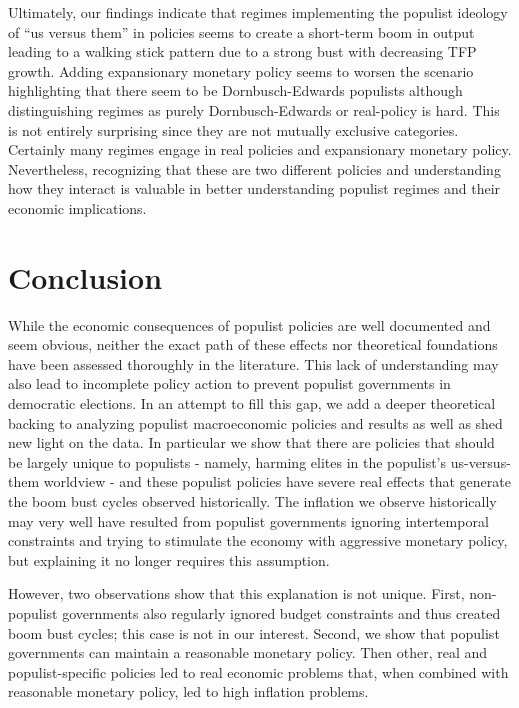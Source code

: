 \documentclass{OUP-EJ}
\begin{document}
Ultimately, our findings indicate that regimes implementing the populist ideology of “us versus them” in policies seems to create a short-term boom in output leading to a walking stick pattern due to a strong bust with decreasing TFP growth. Adding expansionary monetary policy seems to worsen the scenario highlighting that there seem to be Dornbusch-Edwards populists although distinguishing regimes as purely Dornbusch-Edwards or real-policy is hard. This is not entirely surprising since they are not mutually exclusive categories.  Certainly many regimes engage in real policies and expansionary monetary policy.  Nevertheless, recognizing that these are two different policies and understanding how they interact is valuable in better understanding populist regimes and their economic implications.

\section{Conclusion}

While the economic consequences of populist policies are well documented and seem obvious, neither the exact path of these effects nor theoretical foundations have been assessed thoroughly in the literature. This lack of understanding may also lead to incomplete policy action to prevent populist governments in democratic elections. In an attempt to fill this gap, we add a deeper theoretical backing to analyzing populist macroeconomic policies and results as well as shed new light on the data.  In particular we show that there are policies that should be largely unique to populists - namely, harming elites in the populist's us-versus-them worldview - and these populist policies have severe real effects that generate the boom bust cycles observed historically. The inflation we observe historically may very well have resulted from populist governments ignoring intertemporal constraints and trying to stimulate the economy with aggressive monetary policy, but explaining it no longer requires this assumption. 

However, two observations show that this explanation is not unique. First, non-populist governments also regularly ignored budget constraints and thus created boom bust cycles; this case is not in our interest. Second, we show that populist governments can maintain a reasonable monetary policy. Then other, real and populist-specific policies led to real economic problems that, when combined with reasonable monetary policy, led to high inflation problems.  
\end{document}
